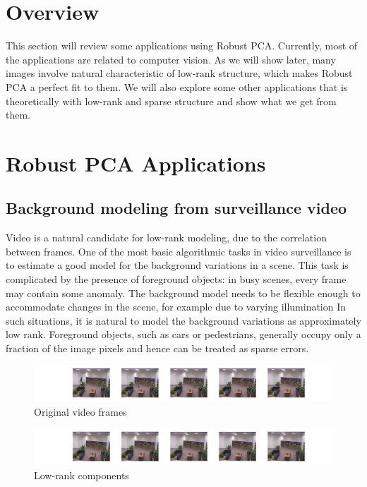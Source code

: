 \documentclass{../../common/projectreport}
\begin{document}
\section{Overview}

This section will review some applications using Robust PCA. Currently, most of the applications are related to computer vision. As we will show later, many images involve natural characteristic of low-rank structure, which makes Robust PCA a perfect fit to them. We will also explore some other applications that is theoretically with low-rank and sparse structure and show what we get from them. 

\section{Robust PCA Applications}

\subsection{Background modeling from surveillance video}

Video is a natural candidate for low-rank modeling, due to the correlation between frames. One of the most basic algorithmic tasks in video surveillance is to estimate a good model for the background variations in a scene. This task is complicated by the presence of foreground objects: in busy scenes, every frame may contain some anomaly. The background model needs to be flexible enough to accommodate changes in the scene, for example due to varying illumination In such situations, it is natural to model the background variations as approximately low rank. Foreground objects, such as cars or pedestrians, generally occupy only a fraction of the image pixels and hence can be treated as sparse errors.

\begin{figure}[hb]
  \centering
  \includegraphics[width=1\textwidth]{SwitchLight_original.jpg}
  \caption{Original video frames}
  \label{fig:video:original}
\end{figure}

\begin{figure}[hb]
  \centering
  \includegraphics[width=1\textwidth]{SwitchLight_low_rank.jpg}
  \caption{Low-rank components}
  \label{fig:video:low_rank}
\end{figure}
\end{document}
